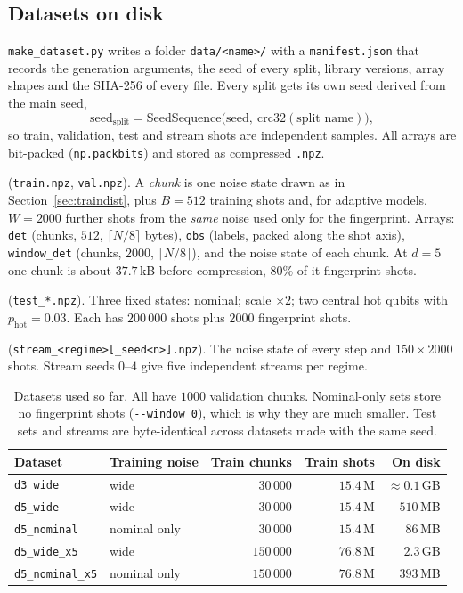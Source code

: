 \documentclass[11pt,a4paper]{article}
\newcommand{\code}[1]{\texttt{#1}}
\begin{document}
\subsection{Datasets on disk}
\code{make\_dataset.py} writes a folder \code{data/<name>/} with a \code{manifest.json} that records the
generation arguments, the seed of every split, library versions, array shapes and the SHA-256 of every file.
Every split gets its own seed derived from the main seed,
\begin{equation*}
  \mathrm{seed}_{\text{split}} = \mathrm{SeedSequence}\bigl(\mathrm{seed},\ \mathrm{crc32}(\text{split name})\bigr),
\end{equation*}
so train, validation, test and stream shots are independent samples. All arrays are bit-packed
(\code{np.packbits}) and stored as compressed \code{.npz}.

\begin{description}[leftmargin=1.2em, labelindent=0em]
\item[Training chunks] (\code{train.npz}, \code{val.npz}). A \emph{chunk} is one noise state drawn as in
  Section~\ref{sec:traindist}, plus $B=512$ training shots and, for adaptive models, $W=2000$ further
  shots from the \emph{same} noise used only for the fingerprint. Arrays: \code{det} (chunks, $512$, $\lceil N/8\rceil$ bytes),
  \code{obs} (labels, packed along the shot axis), \code{window\_det} (chunks, $2000$, $\lceil N/8\rceil$),
  and the noise state of each chunk. At $d=5$ one chunk is about $37.7$\,kB before compression,
  $80\%$ of it fingerprint shots.
\item[Test sets] (\code{test\_*.npz}). Three fixed states: nominal; scale $\times2$; two central hot qubits
  with $p_{\mathrm{hot}}=0.03$. Each has $200\,000$ shots plus $2000$ fingerprint shots.
\item[Streams] (\code{stream\_<regime>[\_seed<n>].npz}). The noise state of every step and
  $150\times2000$ shots. Stream seeds $0$--$4$ give five independent streams per regime.
\end{description}

\begin{table}[h]
\centering
\small
\begin{tabular}{llrrr}
\toprule
Dataset & Training noise & Train chunks & Train shots & On disk \\
\midrule
\code{d3\_wide} & wide & $30\,000$ & $15.4$\,M & $\approx0.1$\,GB \\
\code{d5\_wide} & wide & $30\,000$ & $15.4$\,M & $510$\,MB \\
\code{d5\_nominal} & nominal only & $30\,000$ & $15.4$\,M & $86$\,MB \\
\code{d5\_wide\_x5} & wide & $150\,000$ & $76.8$\,M & $2.3$\,GB \\
\code{d5\_nominal\_x5} & nominal only & $150\,000$ & $76.8$\,M & $393$\,MB \\
\bottomrule
\end{tabular}
\caption{Datasets used so far. All have $1000$ validation chunks. Nominal-only sets store no fingerprint
shots (\code{-{}-window 0}), which is why they are much smaller. Test sets and streams are byte-identical
across datasets made with the same seed.}
\label{tab:datasets}
\end{table}
\end{document}
